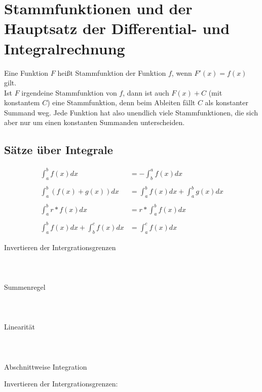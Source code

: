 \section{Stammfunktionen und der Hauptsatz der Differential- und Integralrechnung}
\begin{Definition}
  Eine Funktion $F$ heißt Stammfunktion der Funktion $f$, wenn $F'(x)=f(x)$
  gilt.\\
  Ist $F$ irgendeine Stammfunktion von $f$, dann ist auch $F(x)+C$ (mit
  konstantem $C$) eine Stammfunktion, denn beim Ableiten fällt $C$ als
  konstanter Summand weg. Jede Funktion hat also unendlich viele
  Stammfunktionen, die sich aber nur um einen konstanten Summanden
  unterscheiden.
\end{Definition}
\subsection{Sätze über Integrale}
\begin{Theorem}
  \begin{minipage}{0.6\textwidth}
    \begin{align*}
      \int_a^b f(x)dx &= -\int_b^a f(x)dx\\\\
      \int_a^b (f(x)+g(x))dx &= \int_a^b f(x)dx + \int_a^b g(x)dx\\\\
      \int_a^b r*f(x)dx &= r*\int_a^b f(x)dx\\\\
      \int_a^b f(x)dx + \int_b^c f(x)dx &= \int_a^c f(x)dx
    \end{align*}
  \end{minipage}
  \begin{minipage}{0.4\textwidth}
    Invertieren der Intergrationsgrenzen\\\\\\\\
    Summenregel\\\\\\\\
    Linearität\\\\\\\\
    Abschnittweise Integration
  \end{minipage}

\end{Theorem}
Invertieren der Intergrationsgrenzen:
